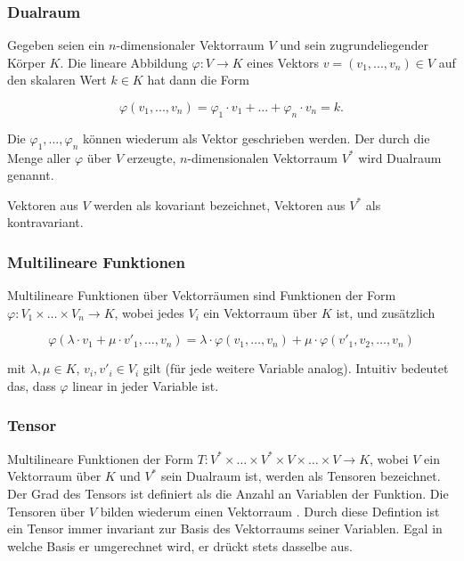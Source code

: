 \documentclass[a4paper,fontsize=12pt,toc=bib,halfparskip,ngerman]{scrartcl}
\begin{document}
\subsubsection{Dualraum}
Gegeben seien ein $n$-dimensionaler Vektorraum  $V$ und sein zugrundeliegender K\"orper $K$. Die lineare Abbildung $\varphi: V \rightarrow K$ eines Vektors $v = (v_1, ..., v_n) \in V$ auf den skalaren Wert $k \in K$ hat dann die Form

\begin{equation}
	\varphi(v_1, ..., v_n) = \varphi_1 \cdot v_1 + ... + \varphi_n \cdot v_n = k.
\end{equation}

Die $\varphi_1, ..., \varphi_n$ k\"onnen wiederum als Vektor geschrieben werden. Der durch die Menge aller $\varphi$ \"uber $V$  erzeugte, $n$-dimensionalen Vektorraum $V^*$ wird Dualraum genannt\cite[S.~203]{bowen2008introduction}.

Vektoren aus $V$ werden als kovariant bezeichnet, Vektoren aus $V^*$ als kontravariant\cite[S.~205]{bowen2008introduction}.

\subsubsection{Multilineare Funktionen}
Multilineare Funktionen \"uber Vektorr\"aumen sind Funktionen der Form $\varphi: V_1 \times \dots \times V_n \rightarrow K$, wobei jedes $V_i$ ein Vektorraum \"uber $K$ ist, und zus\"atzlich 

\begin{equation}
	\varphi(\lambda \cdot v_1 + \mu \cdot v'_1, \dots, v_n) = \lambda \cdot \varphi(v_1, \dots, v_n) + \mu \cdot \varphi(v'_1, v_2, \dots, v_n)
\end{equation}

mit $\lambda, \mu \in K$, $v_i, v'_i \in V_i$ gilt (f\"ur jede weitere Variable analog). Intuitiv bedeutet das, dass $\varphi$ linear in jeder Variable ist\cite[S.~204, 218]{bowen2008introduction}.





\subsubsection{Tensor}
Multilineare Funktionen der Form $T: V^*\times\dots\times V^*\times V \times \dots \times V \rightarrow K$, wobei $V$ ein Vektorraum \"uber $K$ und $V^*$ sein Dualraum ist, werden als Tensoren bezeichnet\cite[S.~218]{bowen2008introduction}. Der Grad des Tensors ist definiert als die Anzahl an Variablen der Funktion. Die Tensoren \"uber $V$ bilden wiederum einen Vektorraum \cite[S.~220]{bowen2008introduction}. Durch diese Defintion ist ein Tensor immer invariant zur Basis des Vektorraums seiner Variablen. Egal in welche Basis er umgerechnet wird, er dr\"uckt stets dasselbe aus.
\end{document}
